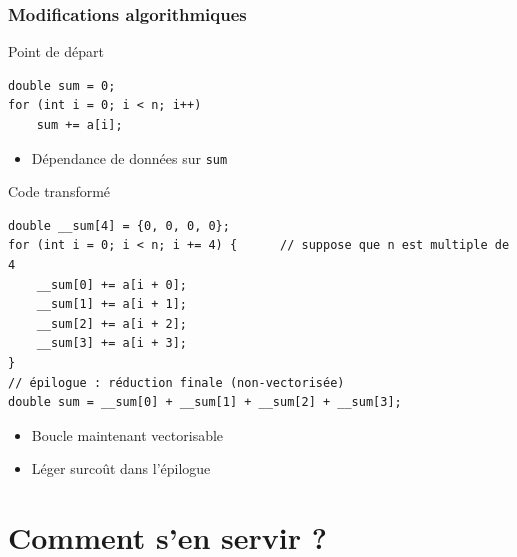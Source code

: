 \documentclass[xcolor={x11names,svgnames}]{beamer}
\begin{document}
\begin{frame}[fragile=singleslide]
  \frametitle{Modifications algorithmiques}

  \begin{block}{Point de départ}

\begin{verbatim}
double sum = 0;
for (int i = 0; i < n; i++)
    sum += a[i];
\end{verbatim}

    \begin{itemize}
    \item Dépendance de données sur \texttt{sum}
    \end{itemize}
  \end{block}

  \begin{exampleblock}{Code transformé}

\begin{verbatim}
double __sum[4] = {0, 0, 0, 0};
for (int i = 0; i < n; i += 4) {      // suppose que n est multiple de 4
    __sum[0] += a[i + 0];
    __sum[1] += a[i + 1];
    __sum[2] += a[i + 2];
    __sum[3] += a[i + 3];
}
// épilogue : réduction finale (non-vectorisée)
double sum = __sum[0] + __sum[1] + __sum[2] + __sum[3];
\end{verbatim}

    \begin{itemize}
    \item Boucle maintenant vectorisable
    \item Léger surcoût dans l'épilogue
    \end{itemize}
  \end{exampleblock}
\end{frame}


\section{Comment s'en servir ?}
\end{document}
